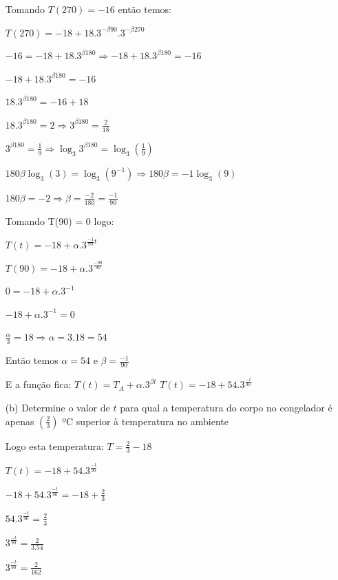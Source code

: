 \begin{multicols*}{2}
\begin{itemize}
            Tomando $T(270) = -16$ então temos:

            $T(270) = -18 + 18.3^{ - \beta 90}.3^{- \beta 270}$

            $-16 = -18 +18.3^{\beta 180} \Rightarrow -18 +18.3^{\beta 180} = -16$

            $-18 +18.3^{\beta 180} = -16$

            $18.3^{\beta 180} = -16 +18 $

            $18.3^{\beta 180} = 2 \Rightarrow 3^{\beta 180} = \frac{2}{18} $

            $3^{\beta 180} = \frac{1}{9} \Rightarrow \log_3 3^{\beta 180} = \log_3 \left( \frac{1}{9}				\right)$

            $180 \beta \log_3 (3) = \log_3 (9^{-1})  \Rightarrow 180 \beta = -1 \log_3 (9)$

            $180 \beta = -2 \Rightarrow \beta = \frac{-2}{180} = \frac{-1}{90}$

            Tomando T(90) = 0 logo:

            $T(t) = -18 + \alpha.3^{\frac{-1}{90} t}$

            $T(90) = -18 + \alpha.3^{\frac{-90}{90} }$

            $0 = -18 + \alpha.3^{-1}$

            $-18 + \alpha.3^{-1} = 0$

            $\frac{\alpha}{3} = 18 \Rightarrow \alpha = 3.18 = 54$


            Então temos $\alpha = 54$ e $\beta = \frac{-1}{90}$

            E a função fica: $T(t) = T_A + \alpha.3^{\beta t}$
            $T(t) = -18 + 54.3^{\frac{-t}{90}}$

        \item[(b)] Determine o valor de $t$ para qual a temperatura do corpo no congelador é apenas
            $\left( \frac{2}{3} \right)$ ºC superior à temperatura no ambiente

            Logo esta temperatura: $T = \frac{2}{3} -18 $

            $T(t) = -18 + 54.3^{\frac{-t}{90}}$

            $-18 + 54.3^{\frac{-t}{90}} = -18 + \frac{2}{3}$

            $ 54.3^{\frac{-t}{90}} = \frac{2}{3}$

            $3^{\frac{-t}{90}} = \frac{2}{3.54}$

            $3^{\frac{-t}{90}} = \frac{2}{162}$


\end{itemize}
\end{multicols*}
